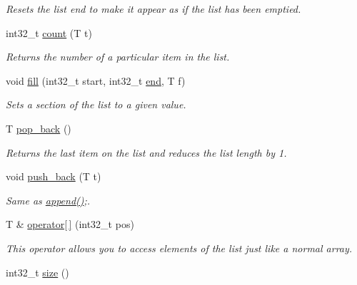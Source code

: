 \begin{DoxyCompactItemize}
\begin{DoxyCompactList}\small\item\em Resets the list end to make it appear as if the list has been emptied. \end{DoxyCompactList}\item 
int32\-\_\-t \hyperlink{classetk_1_1_list_a09fcf2ae4ebe9361094a79e0c508ddb3}{count} (T t)
\begin{DoxyCompactList}\small\item\em Returns the number of a particular item in the list. \end{DoxyCompactList}\item 
void \hyperlink{classetk_1_1_list_a1792af995420ff56d3d98d4c7f2d6388}{fill} (int32\-\_\-t start, int32\-\_\-t \hyperlink{classetk_1_1_list_a19b25cd89872debc07cc002c18845578}{end}, T f)
\begin{DoxyCompactList}\small\item\em Sets a section of the list to a given value. \end{DoxyCompactList}\item 
T \hyperlink{classetk_1_1_list_a85741b89a92238cce95b940ce8a5554e}{pop\-\_\-back} ()
\begin{DoxyCompactList}\small\item\em Returns the last item on the list and reduces the list length by 1. \end{DoxyCompactList}\item 
\hypertarget{classetk_1_1_list_ab7dc844f7e80ac5ea9e7a8923230385a}{void \hyperlink{classetk_1_1_list_ab7dc844f7e80ac5ea9e7a8923230385a}{push\-\_\-back} (T t)}\label{classetk_1_1_list_ab7dc844f7e80ac5ea9e7a8923230385a}

\begin{DoxyCompactList}\small\item\em Same as \hyperlink{classetk_1_1_list_a45df48bc3bb87c2dd26e56f51115ab27}{append()};. \end{DoxyCompactList}\item 
\hypertarget{classetk_1_1_list_aa9d8b7be2e23788eed66bf63e8c6e461}{T \& \hyperlink{classetk_1_1_list_aa9d8b7be2e23788eed66bf63e8c6e461}{operator\mbox{[}$\,$\mbox{]}} (int32\-\_\-t pos)}\label{classetk_1_1_list_aa9d8b7be2e23788eed66bf63e8c6e461}

\begin{DoxyCompactList}\small\item\em This operator allows you to access elements of the list just like a normal array. \end{DoxyCompactList}\item 
\hypertarget{classetk_1_1_list_ac1961365c999b8d5d9a7a187dad9f490}{int32\-\_\-t \hyperlink{classetk_1_1_list_ac1961365c999b8d5d9a7a187dad9f490}{size} ()}\label{classetk_1_1_list_ac1961365c999b8d5d9a7a187dad9f490}


\end{DoxyCompactItemize}
